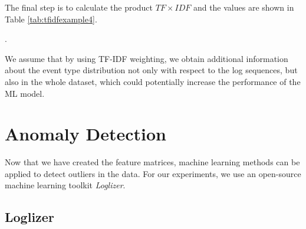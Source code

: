 The final step is to calculate the product $TF \times IDF$ and the values are shown in Table \ref{tab:tfidfexample4}.

\begin{table}[!h]
    \centering
    \caption{TF and IDF scores from the example are multiplied to get TF-IDF}.
    \label{tab:tfidfexample4}
\end{table}

We assume that by using TF-IDF weighting, we obtain additional information about the event type distribution not only with respect to the log sequences, but also in the whole dataset, which could potentially increase the performance of the ML model. 

\section{Anomaly Detection}

Now that we have created the feature matrices, machine learning methods can be applied to detect outliers in the data. For our experiments, we use an open-source machine learning toolkit \textit{Loglizer}. 

\subsection{Loglizer}
\label{subscetion:loglizer}

